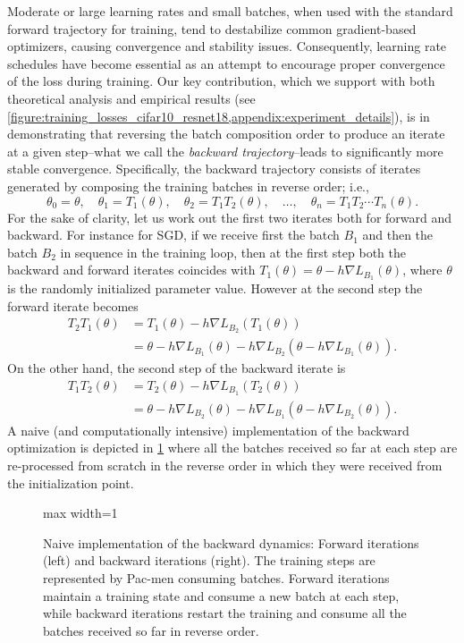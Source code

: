\documentclass[10pt]{article} %
\theoremstyle{plain}
\theoremstyle{definition}
\theoremstyle{remark}
\begin{document}
Moderate or large learning rates and small batches, when used with the standard forward trajectory for training, tend to destabilize common gradient-based optimizers, causing convergence and stability issues. Consequently, learning rate schedules have become essential as an attempt to encourage proper convergence of the loss during training.  Our key contribution, which we support with both theoretical analysis and empirical results (see \cref{figure:training_losses_cifar10_resnet18,appendix:experiment_details}), is in demonstrating that reversing the batch composition order to produce an iterate at a given step--what we call the \emph{backward trajectory}--leads to significantly more stable convergence.  Specifically, the backward trajectory consists of iterates generated by composing the training batches in reverse order; i.e., 
\begin{equation*}
    \theta_0 = \theta,\quad 
    \theta_1 = T_1(\theta), \quad 
    \theta_2 = T_1 T_2(\theta),\quad \dots, \quad 
    \theta_n = T_1 T_2 \cdots  T_n(\theta).
\end{equation*}
For the sake of clarity, let us work out the first two iterates both for forward and backward. For instance for SGD, if we receive first the batch $B_1$ and then the batch $B_2$ in sequence in the training loop, then at the first step both the backward and forward iterates coincides with $T_1(\theta) = \theta - h \nabla L_{B_1}(\theta)$, where $\theta$ is the randomly initialized parameter value. However at the second step the forward iterate becomes
\begin{align*}
    T_2T_1(\theta) 
    &= T_1(\theta) - h \nabla L_{B_2}(T_1(\theta)) \\
    &= \theta - h \nabla L_{B_1}(\theta) - h\nabla L_{B_2}(\theta - h \nabla L_{B_1}(\theta)).
\end{align*}
On the other hand, the second step of the backward iterate is
\begin{align*}
    T_1T_2(\theta) 
    &= T_2(\theta) - h \nabla L_{B_1}(T_2(\theta)) \\
    &= \theta - h \nabla L_{B_2}(\theta) - h\nabla L_{B_1}(\theta - h \nabla L_{B_2}(\theta)).
\end{align*}
A naive (and computationally intensive) implementation of the backward optimization is depicted in \cref{figure:backward_flow} where all the batches received so far at each step are re-processed from scratch in the reverse order in which they were received from the initialization point. 

\begin{figure}[t]
    \centering
    \begin{adjustbox}{max width=1\linewidth}
        
    \end{adjustbox}
    \caption{Naive implementation of the backward dynamics: Forward iterations (left) and backward iterations (right). The training steps are represented by Pac-men consuming batches. Forward iterations maintain a training state and consume a new batch at each step, while backward iterations restart the training and consume all the batches received so far in reverse order.}
    \label{figure:backward_flow}
\end{figure}
\end{document}
